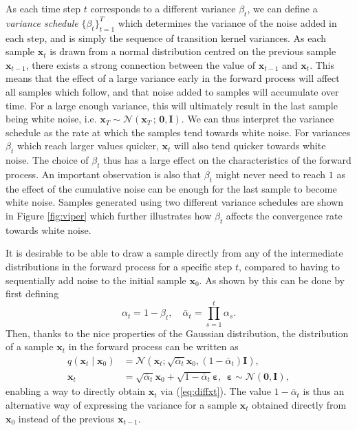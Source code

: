 \documentclass{report}
\begin{document}
As each time step $t$ corresponds to a different variance $\beta_t$, we can define a \textit{variance schedule} $\{\beta_t\}_{t=1}^T$ which determines the variance of the noise added in each step, and is simply the sequence of transition kernel variances. As each sample $\bm{x}_t$ is drawn from a normal distribution centred on the previous sample $\bm{x}_{t-1}$, there exists a strong connection between the value of $\bm{x}_{t-1}$ and $\bm{x}_t$. This means that the effect of a large variance early in the forward process will affect all samples which follow, and that noise added to samples will accumulate over time. For a large enough variance, this will ultimately result in the last sample being white noise, i.e. $\bm{x}_T \sim \mathcal{N}(\bm{x}_T \, ; \, \bm{0}, \bm{I})$. We can thus interpret the variance schedule as the rate at which the samples tend towards white noise. For variances $\beta_t$ which reach larger values quicker, $\bm{x}_t$ will also tend quicker towards white noise. The choice of $\beta_t$ thus has a large effect on the characteristics of the forward process. An important observation is also that $\beta_t$ might never need to reach $1$ as the effect of the cumulative noise can be enough for the last sample to become white noise. Samples generated using two different variance schedules are shown in Figure \ref{fig:viper} which further illustrates how $\beta_t$ affects the convergence rate towards white noise.

It is desirable to be able to draw a sample directly from any of the intermediate  distributions in the forward process for a specific step $t$, compared to having to sequentially add noise to the initial sample $\bm{x}_0$. As shown by \cite{ho2020denoising} this can be done by first defining 
\begin{equation} \label{eq:abar}
    \alpha_t = 1 - \beta_t, \quad \bar{\alpha}_t = \prod_{s=1}^t \alpha_s.
\end{equation}
Then, thanks to the nice properties of the Gaussian distribution, the distribution of a sample $\bm{x}_t$ in the forward process can be written as
\begin{align}
    q(\bm{x}_t \mid \bm{x}_0) &= \mathcal{N} \left( \bm{x}_t ; \sqrt{\bar{\alpha}_t} \bm{x}_0, (1 - \bar{\alpha}_t) \bm{I} \right), \\
    \bm{x}_t &= \sqrt{\bar{\alpha}_t} \bm{x}_0 + \sqrt{1 - \bar{\alpha}_t} \bm{\varepsilon}, \ \ \bm{\varepsilon} \sim \mathcal{N}(\bm{0}, \bm{I}),
    \label{eq:diffxt}
\end{align}
enabling a way to directly obtain $\bm{x}_t$ via (\ref{eq:diffxt}). The value $1-\bar{\alpha}_t$ is thus an alternative way of expressing the variance for a sample $\bm{x}_t$ obtained directly from $\bm{x}_0$ instead of the previous $\bm{x}_{t-1}$.
\end{document}
